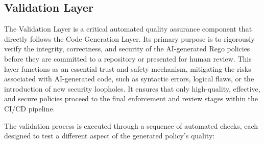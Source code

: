 
\subsection{Validation Layer} %
\label{sec:Validation Layer}

The Validation Layer is a critical automated quality assurance component that directly follows the Code Generation Layer. Its primary purpose is to rigorously verify the integrity, correctness, and security of the AI-generated Rego policies before they are committed to a repository or presented for human review. This layer functions as an essential trust and safety mechanism, mitigating the risks associated with AI-generated code, such as syntactic errors, logical flaws, or the introduction of new security loopholes. It ensures that only high-quality, effective, and secure policies proceed to the final enforcement and review stages within the CI/CD pipeline.

The validation process is executed through a sequence of automated checks, each designed to test a different aspect of the generated policy's quality:

